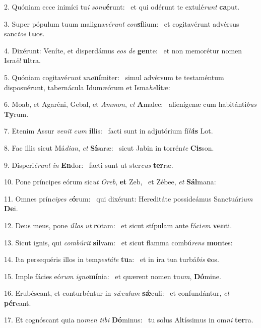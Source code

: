 2. Quóniam ecce inimíci tu\textit{i} \textit{so}\textit{nu}\textbf{é}runt: \ast\  et qui odérunt te extulé\textit{runt} \textbf{ca}put.\

3. Super pópulum tuum maligna\textit{vé}\textit{runt} \textit{con}\textbf{sí}lium: \ast\  et cogitavérunt advérsus sanc\textit{tos} \textbf{tu}os.\

4. Dixérunt: Veníte, et disperdámus \textit{e}\textit{os} \textit{de} \textbf{gen}te: \ast\  et non memorétur nomen Isra\textit{ël} \textbf{ul}tra.\

5. Quóniam cogitavé\textit{runt} \textit{u}\textit{na}\textbf{ní}miter: \ast\  simul advérsum te testaméntum disposuérunt, tabernácula Idumæórum et Isma\textit{he}\textbf{lí}tæ:\

6. Moab, et Agaréni, Gebal, et \textit{Am}\textit{mon}, \textit{et} \textbf{A}malec: \ast\  alienígenæ cum habitánti\textit{bus} \textbf{Ty}rum.\

7. Etenim Assur \textit{ve}\textit{nit} \textit{cum} \textbf{il}lis: \ast\  facti sunt in adjutórium fí\textit{li}\textbf{is} Lot.\

8. Fac illis sicut Má\textit{di}\textit{an}, \textit{et} \textbf{Sí}saræ: \ast\  sicut Jabin in torrén\textit{te} \textbf{Cis}son.\

9. Disperi\textit{é}\textit{runt} \textit{in} \textbf{En}dor: \ast\  facti sunt ut ster\textit{cus} \textbf{ter}ræ.\

10. Pone príncipes eórum sic\textit{ut} \textit{O}\textit{reb}, \textbf{et} Zeb, \ast\  et Zébee, \textit{et} \textbf{Sál}mana:\

11. Omnes prín\textit{ci}\textit{pes} \textit{e}\textbf{ó}rum: \ast\  qui dixérunt: Hereditáte possideámus Sanctuári\textit{um} \textbf{De}i.\

12. Deus meus, pone \textit{il}\textit{los} \textit{ut} \textbf{ro}tam: \ast\  et sicut stípulam ante fáci\textit{em} \textbf{ven}ti.\

13. Sicut ignis, qui \textit{com}\textit{bú}\textit{rit} \textbf{sil}vam: \ast\  et sicut flamma combú\textit{rens} \textbf{mon}tes:\

14. Ita persequéris illos in tem\textit{pes}\textit{tá}\textit{te} \textbf{tu}a: \ast\  et in ira tua turbá\textit{bis} \textbf{e}os.\

15. Imple fácies eó\textit{rum} \textit{i}\textit{gno}\textbf{mí}nia: \ast\  et quærent nomen tu\textit{um}, \textbf{Dó}mine.\

16. Erubéscant, et conturbéntur in \textit{sǽ}\textit{cu}\textit{lum} \textbf{sǽ}culi: \ast\  et confundántur, \textit{et} \textbf{pér}eant.\

17. Et cognóscant quia no\textit{men} \textit{ti}\textit{bi} \textbf{Dó}minus: \ast\  tu solus Altíssimus in om\textit{ni} \textbf{ter}ra.\

